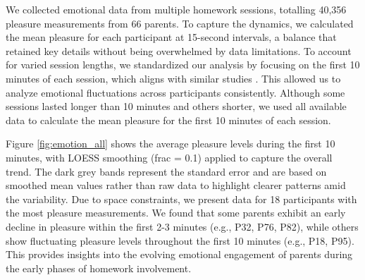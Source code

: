 We collected emotional data from multiple homework sessions, totalling 40,356 pleasure measurements from 66 parents.
To capture the dynamics, we calculated the mean pleasure for each participant at 15-second intervals, a balance that retained key details without being overwhelmed by data limitations.  
To account for varied session lengths, we standardized our analysis by focusing on the first 10 minutes of each session, which aligns with similar studies \cite{tag2022emotion}. This allowed us to analyze emotional fluctuations across participants consistently. Although some sessions lasted longer than 10 minutes and others shorter, we used all available data to calculate the mean pleasure for the first 10 minutes of each session.




Figure \ref{fig:emotion_all} shows the average pleasure levels during the first 10 minutes, with LOESS smoothing (frac = 0.1) applied to capture the overall trend. The dark grey bands represent the standard error and are based on smoothed mean values rather than raw data to highlight clearer patterns amid the variability. Due to space constraints, we present data for 18 participants with the most pleasure measurements. We found that some parents exhibit an early decline in pleasure within the first 2-3 minutes (e.g., P32, P76, P82), while others show fluctuating pleasure levels throughout the first 10 minutes (e.g., P18, P95). This provides insights into the evolving emotional engagement of parents during the early phases of homework involvement.


